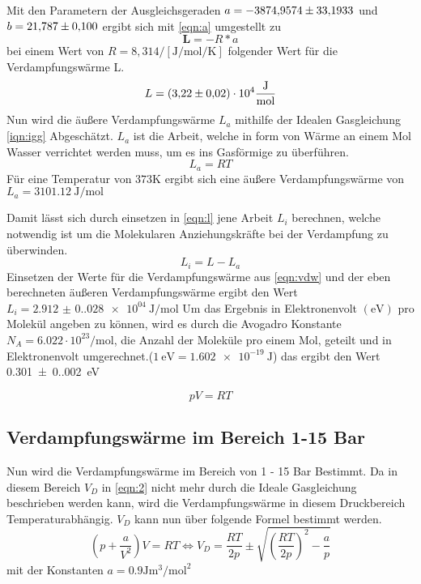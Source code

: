   Mit den Parametern der Ausgleichsgeraden $a = \num{-3874.9574 +- 33.1933}
 $ und $b = \num{21.787 +- 0.10}$ ergibt sich mit \autoref{eqn:a}
  umgestellt zu
  \begin{equation}
    \symbf{L} = -R * a
  \end{equation}
  bei einem Wert von $R =  8,314/[\unit{\joule\per\mol\per\kelvin}] $ 
  folgender Wert für die Verdampfungswärme L.
  \begin{equation*}
    \label{eqn:vdw}
    L = \num{3.22 +- 0.02 e4} \unit{\joule\per\mol}
  \end{equation*}
  Nun wird die äußere Verdampfungswärme $L_a$ mithilfe der Idealen 
  Gasgleichung \autoref{iqn:igg} Abgeschätzt. $L_a$ ist die Arbeit, welche 
  in form von Wärme an einem Mol Wasser verrichtet werden muss, um es
  ins Gasförmige zu überführen. 
  \begin{equation}
    L_a = RT
  \end{equation}
  Für eine Temperatur von $373 \unit{\kelvin}$ ergibt sich eine äußere 
  Verdampfungswärme von $ L_a = \qty{3101.12}{\joule\per\mol}$

  Damit lässt sich durch einsetzen in \autoref{eqn:l} jene Arbeit $L_i$
  berechnen, welche notwendig ist um die Molekularen Anziehungskräfte 
  bei der Verdampfung zu überwinden.
  \begin{equation}
    \label{eqn:l}
    L_i = L - L_a
  \end{equation}
  Einsetzen der Werte für die Verdampfungswärme aus \autoref{eqn:vdw} und der 
  eben berechneten äußeren Verdampfungswärme ergibt den Wert $L_i = \qty{2.912(0.028)e04}{\joule\per\mol}$
  Um das Ergebnis in Elektronenvolt $(\unit{\eV})$ pro Molekül angeben zu können, wird es durch die 
  Avogadro Konstante $N_A = 6.022 \cdot 10^23 \unit{\per\mol}$,
  die Anzahl der Moleküle pro einem Mol, geteilt und in Elektronenvolt 
  umgerechnet.($\qty{1}{\eV} = \qty{1.602e-19}{\joule}$)
  das ergibt den Wert \qty{0.301(0.002)}{\eV}

  \begin{equation}
    \label{qun:igg}
    pV = RT
  \end{equation}


  \subsection{Verdampfungswärme im Bereich 1-15 Bar}

Nun wird die Verdampfungswärme im Bereich von 1 - 15 Bar Bestimmt. 
Da in diesem Bereich $V_D$ in \autoref{eqn:2} nicht mehr durch die Ideale 
Gasgleichung beschrieben werden kann, wird die Verdampfungswärme in diesem 
Druckbereich Temperaturabhängig. $V_D$ kann nun über folgende Formel bestimmt 
werden.
\begin{equation}
  \left(p + \frac{a}{V^2}\right)V = RT \Leftrightarrow V_D = \frac{RT}{2p} \pm \sqrt{\left(\frac{RT}{2p}\right)^2-\frac{a}{p}}
\end{equation}
mit der Konstanten $a = 0.9 \unit{\joule\cubic\meter\per\square\mole}$

